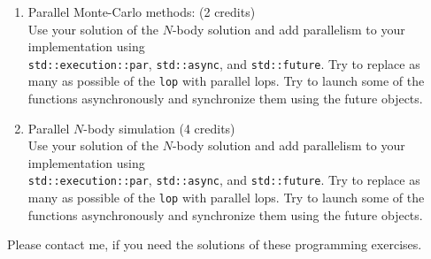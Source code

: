 \documentclass[11pt]{article}
\begin{document}
\begin{enumerate}

\item Parallel Monte-Carlo methods: (2 credits)\\
Use your solution of the $N$-body solution and add parallelism to your implementation using \\
\lstinline|std::execution::par|, \lstinline|std::async|, and \lstinline|std::future|. Try to replace as many as possible of the \lstinline|lop| with parallel lops. Try to launch some of the functions asynchronously and synchronize them using the future objects. 

\item Parallel $N$-body simulation (4 credits)\\
Use your solution of the $N$-body solution and add parallelism to your implementation using \\
\lstinline|std::execution::par|, \lstinline|std::async|, and \lstinline|std::future|. Try to replace as many as possible of the \lstinline|lop| with parallel lops. Try to launch some of the functions asynchronously and synchronize them using the future objects. 

\end{enumerate}
Please contact me, if you need the solutions of these programming exercises.
\doclicenseThis 
\end{document}
